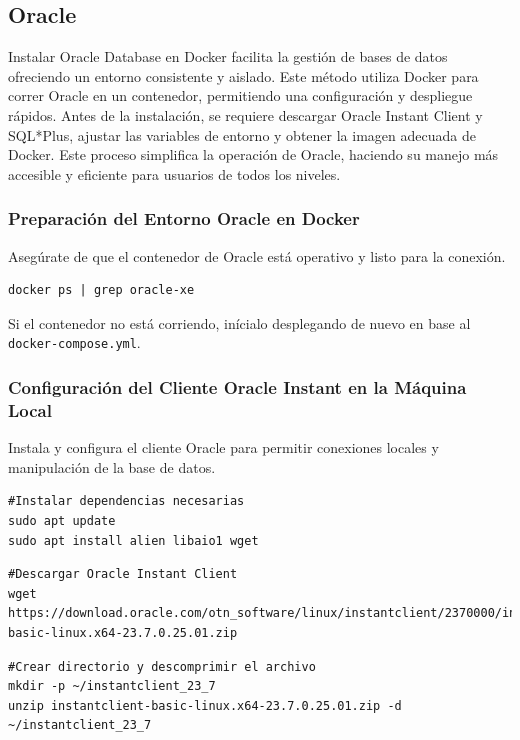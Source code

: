 \documentclass{article}
\begin{document}
\subsection{Oracle}
Instalar Oracle Database en Docker facilita la gestión de bases de datos ofreciendo un entorno consistente y aislado. Este método utiliza Docker para correr Oracle en un contenedor, permitiendo una configuración y despliegue rápidos. Antes de la instalación, se requiere descargar Oracle Instant Client y SQL*Plus, ajustar las variables de entorno y obtener la imagen adecuada de Docker. Este proceso simplifica la operación de Oracle, haciendo su manejo más accesible y eficiente para usuarios de todos los niveles.
\subsubsection{Preparación del Entorno Oracle en Docker}
Asegúrate de que el contenedor de Oracle está operativo y listo para la conexión.

\begin{lstlisting}[style=bashStyle]
docker ps | grep oracle-xe
\end{lstlisting}
Si el contenedor no está corriendo, inícialo desplegando de nuevo en base al \texttt{docker-compose.yml}.

\subsubsection{Configuración del Cliente Oracle Instant en la Máquina Local}
Instala y configura el cliente Oracle para permitir conexiones locales y manipulación de la base de datos.

\begin{lstlisting}[style=bashStyle]
#Instalar dependencias necesarias
sudo apt update
sudo apt install alien libaio1 wget
\end{lstlisting}

\begin{lstlisting}[style=bashStyle]
#Descargar Oracle Instant Client
wget https://download.oracle.com/otn_software/linux/instantclient/2370000/instantclient-basic-linux.x64-23.7.0.25.01.zip
\end{lstlisting}

\begin{lstlisting}[style=bashStyle]
#Crear directorio y descomprimir el archivo
mkdir -p ~/instantclient_23_7
unzip instantclient-basic-linux.x64-23.7.0.25.01.zip -d ~/instantclient_23_7
\end{lstlisting}
\end{document}
